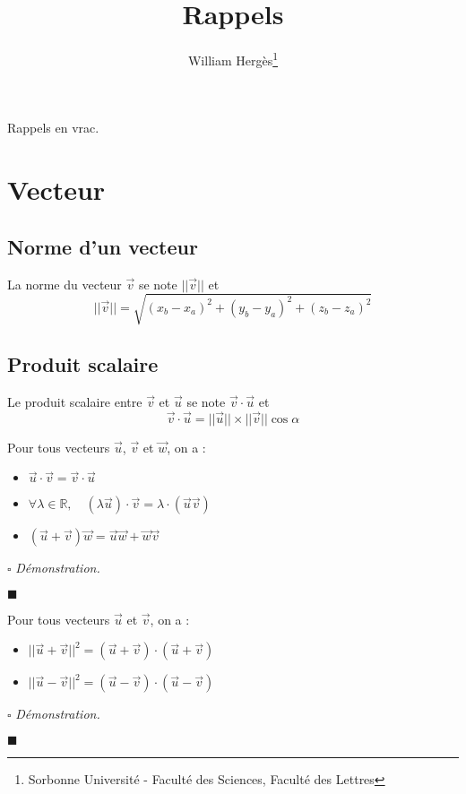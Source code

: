 \documentclass[a4paper, titlepage]{article}
\title{Rappels}
\author{William Hergès\thanks{Sorbonne Université - Faculté des Sciences, Faculté des Lettres}}
\renewenvironment{proof}{$\square$ \footnotesize\textit{Démonstration.}}{\begin{flushright}$\blacksquare$\end{flushright}}
\begin{document}
	\maketitle
	\tableofcontents
	\newpage
	Rappels en vrac.
	\section{Vecteur}
	\subsection{Norme d'un vecteur}
	\begin{defn}
		La norme du vecteur $\vec v$ se note $||\vec v||$ et $$||\vec v||=\sqrt{(x_b-x_a)^2+(y_b-y_a)^2+(z_b-z_a)^2}$$
	\end{defn}
	\subsection{Produit scalaire}
	\begin{defn}
		Le produit scalaire entre $\vec v$ et $\vec u$ se note $\vec v\cdot\vec u$ et $$\vec v\cdot\vec u=||\vec u||\times||\vec v||\cos\alpha$$
	\end{defn}
	\begin{props}
		Pour tous vecteurs $\vec u$, $\vec v$ et $\vec w$, on a :
		\begin{itemize}
			\item $\vec u\cdot\vec v = \vec v\cdot \vec u$
			\item $\forall \lambda\in\mathbb{R},\quad(\lambda\vec u)\cdot\vec v = \lambda\cdot(\vec u\vec v)$
			\item $(\vec u+\vec v)\vec w = \vec u\vec w+\vec w\vec v$
		\end{itemize}
	\end{props}
	\begin{proof}
		\AQT
	\end{proof}
	\begin{props}
		Pour tous vecteurs $\vec u$ et $\vec v$, on a :
		\begin{itemize}
			\item $||\vec u+\vec v||^2 = (\vec u+\vec v)\cdot(\vec u+\vec v)$
			\item $||\vec u-\vec v||^2 = (\vec u-\vec v)\cdot(\vec u-\vec v)$
		\end{itemize}
	\end{props}
	\begin{proof}
		\AQT
	\end{proof}
\end{document}
